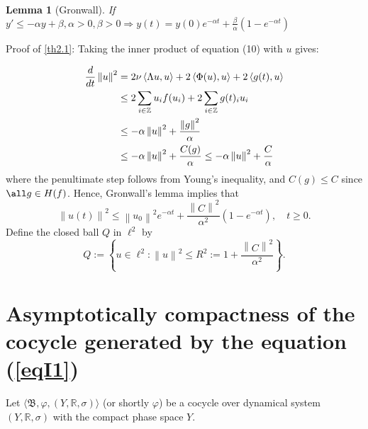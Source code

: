 \documentclass{amsart}%
\newtheorem{lemma}{Lemma}[section]
\begin{document}
{\color{violet}
\begin{lemma}[Gronwall]
    If \(y'\leq -\alpha y + \beta, \alpha>0,\beta>0 \Rightarrow  y(t) = y(0)e^{-\alpha t}+\frac{\beta}{\alpha}(1-e^{-\alpha t}) \)
\end{lemma}
Proof of \ref{th2.1}:
Taking the inner product of equation (10) with \(u\) gives:

\begin{align}
    \frac{d}{dt}\left\lVert u\right\rVert ^2 &= 2\nu \left\langle \Lambda u, u\right\rangle + 2 \left\langle \Phi (u), u\right\rangle + 2 \left\langle g(t), u\right\rangle \notag \\
    &\leq 2 \sum_{i \in \mathbb{Z} } u_i f(u_i) + 2 \sum_{i \in \mathbb{Z} } g(t)_i u_i \notag \\
    &\leq -\alpha \left\lVert u\right\rVert ^2 + \frac{\left\lVert g\right\rVert ^2}{\alpha} \notag \\
    &\leq -\alpha \left\lVert u\right\rVert ^2 + \frac{C(g)}{\alpha} \leq -\alpha \left\lVert u\right\rVert ^2 + \frac{C}{\alpha}
\end{align}
where the penultimate step follows from Young’s inequality, and \(C(g) \leq C\) since \(\all g \in H(f)\). Hence, Gronwall’s lemma
implies that
\[
\left\lVert u(t) \right\rVert^2 \leq \left\lVert u_0 \right\rVert^2 e^{-\alpha t} + \frac{\left\lVert C \right\rVert^2}{\alpha^2} \left( 1 - e^{-\alpha t} \right), \quad t \ge 0.
\]
Define the closed ball \( Q \) in \( \ell^2 \) by
\[
Q := \left\{ u \in \ell^2 : \left\lVert u \right\rVert^2 \le R^2 := 1 + \frac{\left\lVert C \right\rVert^2}{\alpha^2} \right\}.
\]

}



\section{Asymptotically compactness of the cocycle generated by
the equation (\ref{eqI1})}\label{Sec4}

Let $\langle \mathfrak B,\varphi, (Y,\mathbb R,\sigma)\rangle$ (or
shortly $\varphi$) be a cocycle over dynamical system $(Y,\mathbb
R,\sigma)$ with the compact phase space $Y$.
\end{document}
